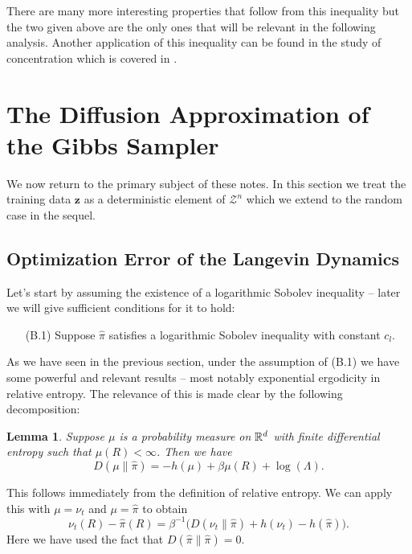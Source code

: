\documentclass{article}
\makeatletter
\newtheorem{lemma}[theorem]{Lemma}
\def\namedlabel#1#2{\begingroup
    #2%
    \def\@currentlabel{#2}%
    \label{#1}\endgroup
}
\newcommand{\Bbf}[1]{\mathbf{#1}}
\newcommand{\Bcal}[1]{\mathcal{#1}}
\makeatother
\begin{document}
There are many more interesting properties that follow from this inequality but the two given above are the only ones that will be relevant in the following analysis. Another application of this inequality can be found in the study of concentration which is covered in \cite{vanHandel2014ProbabilityDimension}.

\section{The Diffusion Approximation of the Gibbs Sampler}
We now return to the primary subject of these notes. In this section we treat the training data \(\Bbf{z}\) as a deterministic element of \(\Bcal{Z}^n\) which we extend to the random case in the sequel.

\subsection{Optimization Error of the Langevin Dynamics}
Let's start by assuming the existence of a logarithmic Sobolev inequality -- later we will give sufficient conditions for it to hold:
\begin{enumerate}
    \item[\namedlabel{itm:ass_log_sob}{(B.1)}] Suppose \(\hat{\pi}\) satisfies a logarithmic Sobolev inequality with constant \(c_l\).
\end{enumerate}
As we have seen in the previous section, under the assumption of (B.1) we have some powerful and relevant results -- most notably exponential ergodicity in relative entropy. The relevance of this is made clear by the following decomposition:

\begin{lemma}\label{lem:rel_ent_decomp}
Suppose \(\mu\) is a probability measure on \(\Bbb{R}^d\) with finite differential entropy such that \(\mu(R) < \infty\). Then we have
\begin{equation*}
    D(\mu \| \hat{\pi}) = -h(\mu) + \beta \mu(R) + \log(\Lambda).
\end{equation*}
\end{lemma}

This follows immediately from the definition of relative entropy. We can apply this with \(\mu = \nu_t\) and \(\mu = \hat{\pi}\) to obtain
\begin{equation}\label{eq:lang_opt_term}
    \nu_t(R) - \hat{\pi}(R) = \beta^{-1} \big ( D(\nu_t \| \hat{\pi}) + h(\nu_t) - h(\hat{\pi}) \big ).
\end{equation}
Here we have used the fact that \(D(\hat{\pi} \| \hat{\pi}) = 0\).
\end{document}
